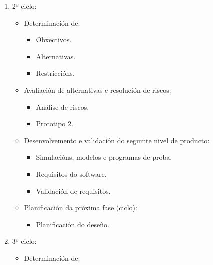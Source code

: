 \begin{itemize}
\begin{itemize}
\begin{enumerate}
\begin{itemize}
\begin{itemize}
                            \end{itemize}
                     \end{itemize}
               \item 2º ciclo:
                     \begin{itemize}
                      \item Determinación de:
                            \begin{itemize}
                             \item Obxectivos.
                             \item Alternativas.
                             \item Restriccións.
                            \end{itemize}
                      \item Avaliación de alternativas e resolución de riscos:
                            \begin{itemize}
                             \item Análise de riscos.
                             \item Prototipo 2.
                            \end{itemize}
                      \item Desenvolvemento e validación do seguinte nivel de producto:
                            \begin{itemize}
                             \item Simulacións, modelos e programas de proba.
                             \item Requisitos do software.
                             \item Validación de requisitos.
                            \end{itemize}
                      \item Planificación da próxima fase (ciclo):
                            \begin{itemize}
                             \item Planificación do deseño.
                            \end{itemize}
                     \end{itemize}
               \item 3º ciclo:
                     \begin{itemize}
                      \item Determinación de:
                            \begin{itemize}

\end{itemize}
\end{itemize}
\end{enumerate}
\end{itemize}
\end{itemize}
